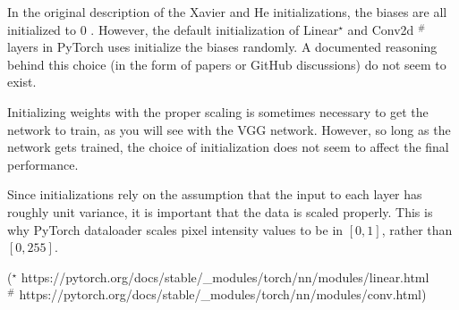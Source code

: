 \documentclass{report}
\begin{document}
\begin{concept}
    In the original description of the Xavier and He initializations, the biases are all initialized to 0 . However, the default initialization of Linear${ }^{\star}$ and Conv2d ${ }^{\#}$ layers in PyTorch uses initialize the biases randomly. A documented reasoning behind this choice (in the form of papers or GitHub discussions) do not seem to exist.

    Initializing weights with the proper scaling is sometimes necessary to get the network to train, as you will see with the VGG network. However, so long as the network gets trained, the choice of initialization does not seem to affect the final performance.

    Since initializations rely on the assumption that the input to each layer has roughly unit variance, it is important that the data is scaled properly. This is why PyTorch dataloader scales pixel intensity values to be in $[0,1]$, rather than $[0,255]$.

    (${ }^{\star}$ https://pytorch.org/docs/stable/_modules/torch/nn/modules/linear.html\\
    ${ }^{\#}$ https://pytorch.org/docs/stable/_modules/torch/nn/modules/conv.html)
\end{concept}
\end{document}
